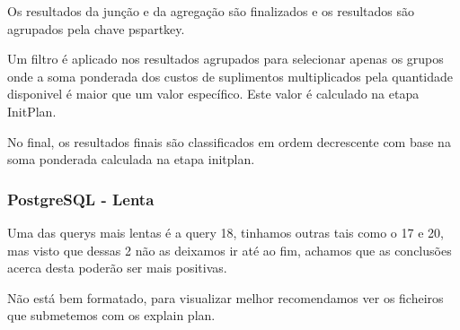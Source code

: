 \documentclass{article}
\begin{document}
Os resultados da junção e da agregação são finalizados e os resultados são agrupados pela chave ps\underline{}partkey.

Um filtro é aplicado nos resultados agrupados para selecionar apenas os grupos onde a soma ponderada dos custos de suplimentos multiplicados pela quantidade disponivel é maior que um valor específico. Este valor é calculado na etapa InitPlan.

No final, os resultados finais são classificados em ordem decrescente com base na soma ponderada calculada na etapa initplan.

\subsubsection{PostgreSQL - Lenta}
Uma das querys mais lentas é a query 18, tinhamos outras tais como o 17 e 20, mas visto que dessas 2 não as deixamos ir até ao fim, achamos que as conclusões acerca desta poderão ser mais positivas.

Não está bem formatado, para visualizar melhor recomendamos ver os ficheiros que submetemos com os explain plan.
\end{document}
